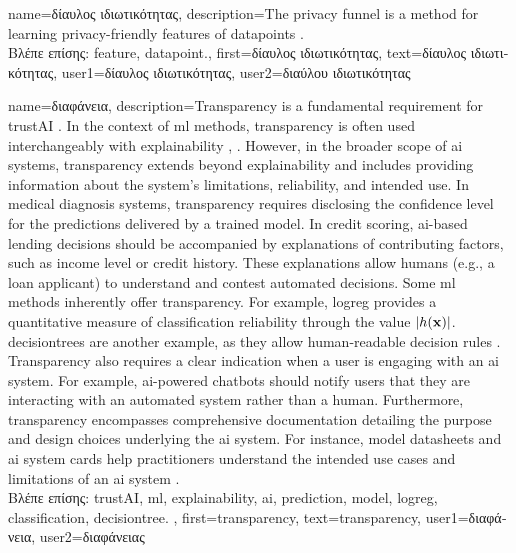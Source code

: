 {name={\foreignlanguage{greek}{δίαυλος ιδιωτικότητας}},
 description={The privacy funnel is a method for learning privacy-friendly \gls{feature}s 
	of \gls{datapoint}s \cite{PrivacyFunnel}.\\
	\foreignlanguage{greek}{Βλέπε επίσης:} \gls{feature}, \gls{datapoint}.},
 first={\foreignlanguage{greek}{δίαυλος ιδιωτικότητας}},
 text={\foreignlanguage{greek}{δίαυλος ιδιωτικότητας}},
 user1={\foreignlanguage{greek}{δίαυλος ιδιωτικότητας}}, %
 user2={\foreignlanguage{greek}{διαύλου ιδιωτικότητας}} %
}

{name={\foreignlanguage{greek}{διαφάνεια}},
	description={Transparency is a fundamental requirement for 
		\gls{trustAI} \cite{HLEGTrustworhtyAI}. In the context of \gls{ml} 
		methods, transparency is often used interchangeably with \gls{explainability} 
		\cite{JunXML2020}, \cite{gallese2023ai}. However, in the broader scope of \gls{ai} 
		systems, transparency extends beyond \gls{explainability} and includes providing information 
		about the system’s limitations, reliability, and intended use. 
		In medical diagnosis systems, transparency requires disclosing the confidence level 
		for the \gls{prediction}s delivered by a trained \gls{model}. In credit scoring, 
		\gls{ai}-based lending decisions should be accompanied by explanations of 
		contributing factors, such as income level or credit history. These explanations 
		allow humans (e.g., a loan applicant) to understand and contest automated decisions. 
		Some \gls{ml} methods inherently offer transparency. For example, \gls{logreg} 
		provides a quantitative measure of \gls{classification} reliability through the value $|h({\bf x})|$. 
		\Gls{decisiontree}s are another example, as they allow human-readable decision rules \cite{rudin2019stop}.
		Transparency also requires a clear indication when a user is engaging with an \gls{ai} system. 
		For example, \gls{ai}-powered chatbots should notify users that they are interacting with an 
		automated system rather than a human. Furthermore, transparency encompasses comprehensive 
		documentation detailing the purpose and design choices underlying the \gls{ai} system. 
		For instance, \gls{model} datasheets \cite{DatasheetData2021} and \gls{ai} system cards \cite{10.1145/3287560.3287596} 
		help practitioners understand the intended use cases and limitations of an \gls{ai} system \cite{Shahriari2017}.\\
		\foreignlanguage{greek}{Βλέπε επίσης:} \gls{trustAI}, \gls{ml}, \gls{explainability}, \gls{ai}, \gls{prediction}, \gls{model}, \gls{logreg}, \gls{classification}, \gls{decisiontree}. },
	first={transparency}, 
	text={transparency},
	user1={\foreignlanguage{greek}{διαφάνεια}}, %
    	user2={\foreignlanguage{greek}{διαφάνειας}} %
}

